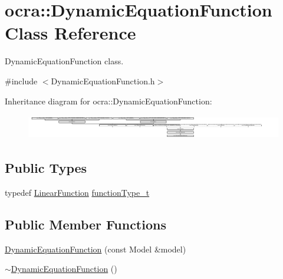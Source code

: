 \hypertarget{classocra_1_1DynamicEquationFunction}{}\section{ocra\+:\+:Dynamic\+Equation\+Function Class Reference}
\label{classocra_1_1DynamicEquationFunction}


Dynamic\+Equation\+Function class.  




{\ttfamily \#include $<$Dynamic\+Equation\+Function.\+h$>$}

Inheritance diagram for ocra\+:\+:Dynamic\+Equation\+Function\+:\begin{figure}[H]
\begin{center}
\leavevmode
\includegraphics[height=1.082126cm]{d9/da6/classocra_1_1DynamicEquationFunction}
\end{center}
\end{figure}
\subsection*{Public Types}
\begin{DoxyCompactItemize}
\item 
typedef \hyperlink{classocra_1_1LinearFunction}{Linear\+Function} \hyperlink{classocra_1_1DynamicEquationFunction_a2c8c76bfd66285d63895ec34219175b4}{function\+Type\+\_\+t}
\end{DoxyCompactItemize}
\subsection*{Public Member Functions}
\begin{DoxyCompactItemize}
\item 
\hyperlink{classocra_1_1DynamicEquationFunction_ab6a38098b1aac7db298e0f3a93955624}{Dynamic\+Equation\+Function} (const Model \&model)
\item 
\hyperlink{classocra_1_1DynamicEquationFunction_a84c82f21c1564aaca6b5aa703ecae73e}{$\sim$\+Dynamic\+Equation\+Function} ()
\end{DoxyCompactItemize}
